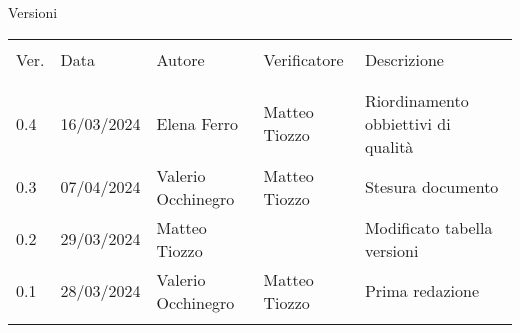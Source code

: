 \documentclass[italian,12pt]{article} %
\begin{document}


\newpage



\captionsetup[table]{list=no}

\begin{table}[!h]
	\begin{center}
		Versioni\\
		\vspace{0.5cm}
		\begin{tabular}{ l l l l l }
			\hline                                                                                       \\[-2ex]
			Ver. & Data       & Autore             & Verificatore  & Descrizione                         \\
			\\[-2ex] \hline \\[-1.5ex]

			0.4  & 16/03/2024 & Elena Ferro        & Matteo Tiozzo & Riordinamento obbiettivi di qualità \\
			0.3  & 07/04/2024 & Valerio Occhinegro & Matteo Tiozzo & Stesura documento                   \\
			0.2  & 29/03/2024 & Matteo Tiozzo      &               & Modificato tabella versioni         \\
			0.1  & 28/03/2024 & Valerio Occhinegro & Matteo Tiozzo & Prima redazione                     \\
			\\[-1.5ex] \hline
		\end{tabular}
	\end{center}
\end{table}
\captionsetup[table]{list=yes}

\newpage
\tableofcontents
\listoftables
\listoffigures
\newpage









\end{document}
